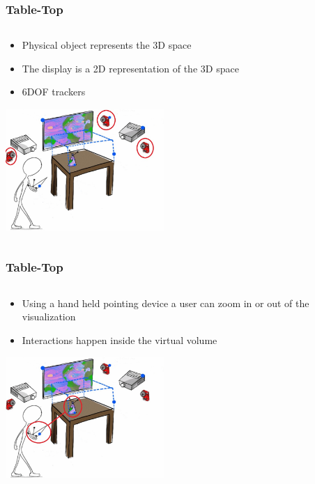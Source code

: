 \documentclass{beamer}
\begin{document}
\begin{frame}
\frametitle{Table-Top} 
	\begin{columns}
    \begin{column}{0.9\textwidth}
    \begin{itemize}
		\item Physical object represents the 3D space
		\item The display is a 2D representation of the 3D space
		\item 6DOF trackers
	\end{itemize}
	
	\begin{center}
	\includegraphics[width=6cm]{images/Tabletop6DOF}
	
	\cite{3D}
	\end{center}
	\end{column}
    \end{columns}
\end{frame}

\begin{frame}
\frametitle{Table-Top} 
	\begin{columns}
    \begin{column}{0.9\textwidth}
    \begin{itemize}
		\item Using a hand held pointing device a user can zoom in or out of the visualization 
		\item Interactions happen inside the virtual volume
	\end{itemize}
	\begin{center}

	\includegraphics[width=6cm]{images/TabletopZoom}
	
	\cite{3D}
	\end{center}
	\end{column}
    \end{columns}
\end{frame}
\end{document}
